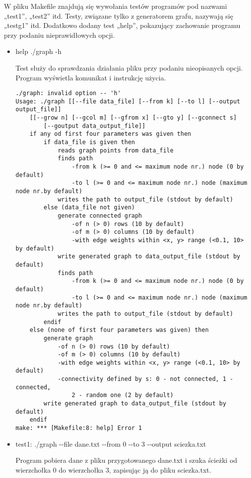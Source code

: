 \documentclass[]{article}
\begin{document}
W pliku Makefile znajdują się wywołania testów programów pod nazwami „test1”, „test2” itd. Testy, związane tylko z generatorem grafu, nazywają się „testg1” itd. Dodatkowo dodany test „help”, pokazujący zachowanie programu przy podaniu nieprawidłowych opcji.
\begin{itemize}
    \item help
    ./graph -h
    
    Test służy do sprawdzania działania pliku przy podaniu nieopisanych opcji. Program wyświetla komunikat i instrukcję użycia.
\begin{verbatim}
./graph: invalid option -- 'h'
Usage: ./graph [[--file data_file] [--from k] [--to l] [--output output_file]] 
    [[--grow n] [--gcol m] [--gfrom x] [--gto y] [--gconnect s]
        [--goutput data_output_file]]
    if any od first four parameters was given then
        if data_file is given then
            reads graph points from data_file
            finds path
                -from k (>= 0 and <= maximum node nr.) node (0 by default)
                -to l (>= 0 and <= maximum node nr.) node (maximum node nr.by default)
            writes the path to output_file (stdout by default)
        else (data_file not given)
            generate connected graph
                -of n (> 0) rows (10 by default)
                -of m (> 0) columns (10 by default)
                -with edge weights within <x, y> range (<0.1, 10> by default) 
            write generated graph to data_output_file (stdout by default)
            finds path
                -from k (>= 0 and <= maximum node nr.) node (0 by default)
                -to l (>= 0 and <= maximum node nr.) node (maximum node nr.by default)
            writes the path to output_file (stdout by default)
        endif
    else (none of first four parameters was given) then
        generate graph
            -of n (> 0) rows (10 by default)
            -of m (> 0) columns (10 by default)
            -with edge weights within <x, y> range (<0.1, 10> by default) 
            -connectivity defined by s: 0 - not connected, 1 - connected,
                2 - random one (2 by default)
        write generated graph to data_output_file (stdout by default)
    endif
make: *** [Makefile:8: help] Error 1
\end{verbatim}
    \item test1:
    ./graph -{}-file dane.txt -{}-from 0 -{}-to 3 -{}-output sciezka.txt
    
    Program pobiera dane z pliku przygotowanego dane.txt i szuka ścieżki od wierzchołka 0 do wierzchołka 3, zapisując ją do pliku sciezka.txt.
    

\end{itemize}
\end{document}
